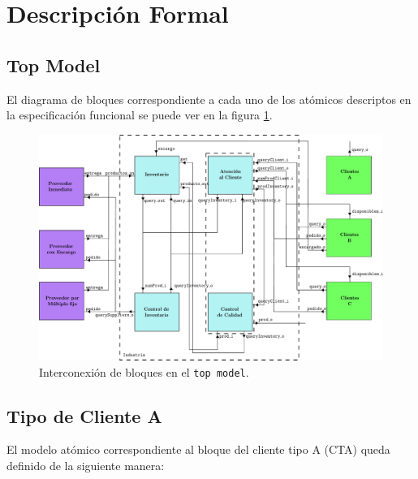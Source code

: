 \documentclass[10pt]{article}
\begin{document}
\section{Descripción Formal}

\subsection{Top Model\label{sec:TM}} 
El diagrama de bloques correspondiente a cada uno de los atómicos descriptos en la especificación funcional se puede ver en la figura \ref{fig:TM-esquematico}.  
 
\begin{figure}[htbp] 
  \centering 
  \includegraphics[angle=-90, scale=0.7]{img/bloquestopmodel} 
  \caption{Interconexión de bloques en el \texttt{top model}.} 
  \label{fig:TM-esquematico} 
\end{figure}

\subsection{Tipo de Cliente A\label{sec:CTA}}

El modelo atómico correspondiente al bloque del cliente tipo A (CTA) queda definido de la siguiente manera:

\\
\end{document}
